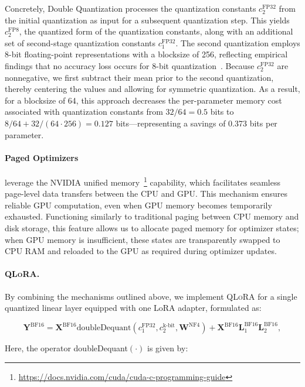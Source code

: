 Concretely, Double Quantization processes the quantization constants $c_2^{\text{FP32}}$ from the initial quantization as input for a subsequent quantization step. This yields $c_2^{\text{FP8}}$, the quantized form of the quantization constants, along with an additional set of second-stage quantization constants $c_1^{\text{FP32}}$. The second quantization employs 8-bit floating-point representations with a blocksize of 256, reflecting empirical findings that no accuracy loss occurs for 8-bit quantization~\citep{dettmers2022case}. Because $c_2^{\text{FP32}}$ are nonnegative, we first subtract their mean prior to the second quantization, thereby centering the values and allowing for symmetric quantization. As a result, for a blocksize of 64, this approach decreases the per-parameter memory cost associated with quantization constants from $32/64 = 0.5$ bits to $8/64 + 32/(64 \cdot 256) = 0.127$ bits—representing a savings of 0.373 bits per parameter.

\paragraph{Paged Optimizers} leverage the NVIDIA unified memory~\footnote{\tiny \url{https://docs.nvidia.com/cuda/cuda-c-programming-guide}} capability, which facilitates seamless page-level data transfers between the CPU and GPU. This mechanism ensures reliable GPU computation, even when GPU memory becomes temporarily exhausted. Functioning similarly to traditional paging between CPU memory and disk storage, this feature allows us to allocate paged memory for optimizer states; when GPU memory is insufficient, these states are transparently swapped to CPU RAM and reloaded to the GPU as required during optimizer updates.

\paragraph{\textsc{QLoRA}.} By combining the mechanisms outlined above, we implement \textsc{QLoRA} for a single quantized linear layer equipped with one LoRA adapter, formulated as:

\begin{equation}
    \mathbf{Y}^{\text{BF16}} =  \mathbf{X}^{\text{BF16}} \text{doubleDequant}(c_1^{\text{FP32}}, c_2^{\text{k-bit}}, \mathbf{W}^{\text{NF4}}) + \mathbf{X}^{\text{BF16}}\mathbf{L}^{\text{BF16}}_1\mathbf{L}^{\text{BF16}}_2,
\end{equation}

Here, the operator doubleDequant$(\cdot)$ is given by:

